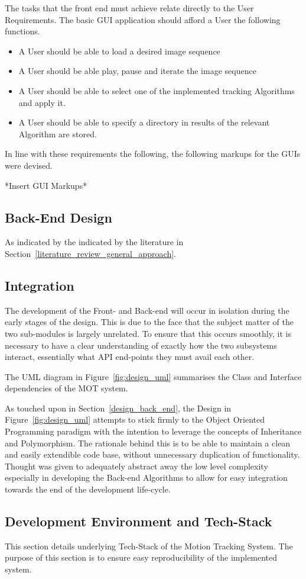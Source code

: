 The tasks that the front end must achieve relate directly to the User
Requirements. The basic GUI application should afford a User the following functions.
\begin{itemize}
    \item A User should be able to load a desired image sequence
    \item A User should be able play, pause and iterate the image sequence 
    \item A User should be able to select one of the implemented tracking
        Algorithms and apply it.
    \item A User should be able to specify a directory in results of the
        relevant Algorithm are stored.
\end{itemize}

In line with these requirements the following, the following markups for the
GUIs were devised.

*Insert GUI Markups* 

\subsection{Back-End Design}
As indicated by the indicated by the literature in
Section~\ref{literature_review_general_approach}. 

\subsection{Integration}
The development of the Front- and Back-end will occur in isolation during the
early stages of the design. This is due to the face that the subject matter of
the two sub-modules is largely unrelated.  To ensure that this occurs smoothly,
it is necessary to have a clear understanding of exactly how the two subsystems
interact, essentially what API end-points they must avail each other.

The UML diagram in Figure~\ref{fig:design_uml} summarises the Class and Interface dependencies of the
MOT system.

\newpage
{} 
\newpage

As touched upon in Section~\ref{design_back_end}, the Design in
Figure~\ref{fig:design_uml} attempts to stick firmly to the Object Oriented
Programming paradigm with the intention to leverage the concepts of Inheritance and
Polymorphism. The rationale behind this is to be able to maintain a clean and
easily extendible code base, without unnecessary duplication of functionality.
Thought was given to adequately abstract away the low level complexity
especially in developing the Back-end Algorithms to allow for easy integration
towards the end of the development life-cycle. 

\subsection{Development Environment and Tech-Stack}
This section details underlying Tech-Stack of the Motion Tracking System. The
purpose of this section is to ensure easy reproducibility of the implemented
system.


